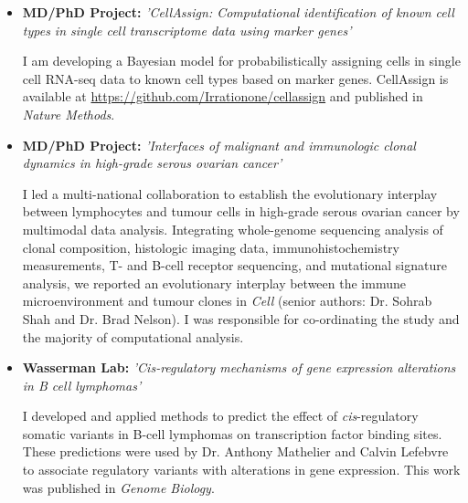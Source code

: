 \documentclass[11pt,a4paper,sans]{moderncv}        %
\begin{document}
\begin{itemize}

\item{\textbf{MD/PhD Project:} \textit{'CellAssign: Computational identification of known cell types in single cell transcriptome data using marker genes'}

\vspace{3pt}

\small{I am developing a Bayesian model for probabilistically assigning cells in single cell RNA-seq data to known cell types based on marker genes. CellAssign is available at \url{https://github.com/Irrationone/cellassign}} and published in \emph{Nature Methods}.}

\vspace{6pt}

\item{\textbf{MD/PhD Project:} \textit{'Interfaces of malignant and immunologic clonal dynamics in high-grade serous ovarian cancer'}

\vspace{3pt}

\small{I led a multi-national collaboration to establish the evolutionary interplay between lymphocytes and tumour cells in high-grade serous ovarian cancer by multimodal data analysis. Integrating whole-genome sequencing analysis of clonal composition, histologic imaging data, immunohistochemistry measurements, T- and B-cell receptor sequencing, and mutational signature analysis, we reported an evolutionary interplay between the immune microenvironment and tumour clones in \emph{Cell} (senior authors: Dr. Sohrab Shah and Dr. Brad Nelson). I was responsible for co-ordinating the study and the majority of computational analysis.}}

\vspace{6pt}

\item{\textbf{Wasserman Lab:} \textit{'Cis-regulatory mechanisms of gene expression alterations in B cell lymphomas'}

\vspace{3pt}

\small{I developed and applied methods to predict the effect of \emph{cis}-regulatory somatic variants in B-cell lymphomas on transcription factor binding sites. These predictions were used by Dr. Anthony Mathelier and Calvin Lefebvre to associate regulatory variants with alterations in gene expression. This work was published in \emph{Genome Biology}.}}


\end{itemize}
\end{document}
